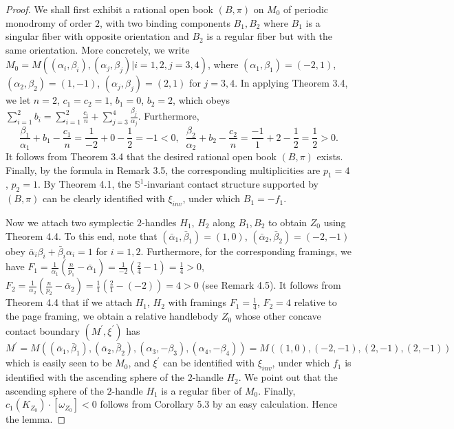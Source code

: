 \documentclass[11pt]{amsart}
\theoremstyle{plain}
\numberwithin{theorem}{section}
\theoremstyle{definition}
\newcommand{\s}{{\mathbb S}}
\begin{document}
\begin{proof}
We shall first exhibit a rational open book $(B,\pi)$ on $M_0$ of periodic monodromy of order $2$, with two binding components $B_1,B_2$ where $B_1$ is a singular fiber with opposite orientation and $B_2$ is a regular fiber but with the same orientation. More concretely, we write
$M_0=M((\alpha_i,\beta_i), (\alpha_j,\beta_j)| i =1,2,j=3,4)$, where $(\alpha_1,\beta_1)=(-2,1)$, 
$(\alpha_2,\beta_2)=(1,-1)$, $(\alpha_j,\beta_j)=(2,1)$ for $j=3,4$. In applying Theorem 3.4, we let
$n=2$, $c_1=c_2=1$, $b_1=0$, $b_2=2$, which obeys $\sum_{i=1}^2 b_i=\sum_{i=1}^2 \frac{c_i}{n}+
\sum_{j=3}^4 \frac{\beta_j}{\alpha_j}$. Furthermore,
$$
\frac{\beta_1}{\alpha_1}+b_1-\frac{c_1}{n}=\frac{1}{-2}+0-\frac{1}{2}=-1<0, \;\;
\frac{\beta_2}{\alpha_2}+b_2-\frac{c_2}{n}=\frac{-1}{1}+2-\frac{1}{2}=\frac{1}{2}>0.
$$
It follows from Theorem 3.4 that the desired rational open book $(B,\pi)$ exists. Finally, by the formula in Remark 3.5, the corresponding multiplicities are $p_1=4$, $p_2=1$. By Theorem 4.1, the $\s^1$-invariant contact structure supported by $(B,\pi)$ can be clearly identified with $\xi_{inv}$, under 
which $B_1=-f_1$. 

Now we attach two symplectic $2$-handles $H_1$, $H_2$ along $B_1,B_2$ to obtain $Z_0$ using Theorem 4.4. To this end, note that $(\bar{\alpha}_1,\bar{\beta}_1)=(1,0)$, 
$(\bar{\alpha}_2,\bar{\beta}_2)=(-2,-1)$ obey $\bar{\alpha}_i\beta_i+\bar{\beta}_i\alpha_i=1$ for 
$i=1,2$. Furthermore, for the corresponding framings, we have 
$F_1=\frac{1}{\alpha_1}(\frac{n}{p_1}-\bar{\alpha}_1)=\frac{1}{-2}(\frac{2}{4}-1)=\frac{1}{4}>0$,
$F_2=\frac{1}{\alpha_2}(\frac{n}{p_2}-\bar{\alpha}_2)=\frac{1}{1}(\frac{2}{1}-(-2))=4>0$ (see Remark 4.5). It follows from Theorem 4.4 that if we attach $H_1$, $H_2$ with framings $F_1=\frac{1}{4}$, $F_2=4$ relative to the page framing, we obtain a relative handlebody $Z_0$ whose other concave contact boundary $(M^\prime,\xi^\prime)$ 
has 
$$
M^\prime=M((\bar{\alpha}_1,\bar{\beta}_1), (\bar{\alpha}_2,\bar{\beta}_2), (\alpha_3,-\beta_3),
(\alpha_4,-\beta_4))=M((1,0),(-2,-1), (2,-1), (2,-1))
$$
which is easily seen to be $M_0$, and $\xi^\prime$ can be identified with $\xi_{inv}$, under which
$f_1$ is identified with the ascending sphere of the $2$-handle $H_2$. We point out that the ascending sphere of the $2$-handle $H_1$ is a regular fiber of $M_0$. Finally, 
$c_1(K_{Z_0})\cdot [\omega_{Z_0}]<0$ follows from Corollary 5.3 by an easy calculation. Hence the lemma. 

\end{proof}
\end{document}
